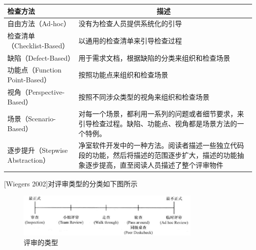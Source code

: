 \vspace{-0.8em}
\begin{center}
\begin{longtable}{|m{3cm}<{\centering}|m{8.5cm}|}
    \hline
    检查方法                       & \multicolumn{1}{c|}{描述}                                                                    \\ \hline
    自由方法（Ad-hoc）               & 没有为检查人员提供系统化的引导                                                       \\ \hline
    检查清单（Checklist-Based）      & 以通用的检查清单来引导检查过程                                                       \\ \hline
    缺陷（Defect-Based）           & 用于需求文档，根据缺陷的分类来组织和检查场景                                                \\ \hline
    功能点（Function Point-Based）  & 按照功能点来组织和检查场景                                                         \\ \hline
    视角（Perspective-Based）      & 按照不同涉众类型的视角来组织和检查场景                                                   \\ \hline
    场景（Scenario-Based）         & 对每一个场景，都利用一系列的问题或者细节要求，来引导检查过程。缺陷、功能点、视角都是场景方法的一个特例。                  \\ \hline
    逐步提升（Stepwise Abstraction） & 净室软件开发中的一种方法。阅读者描述一些独立代码段的功能，然后将描述的范围逐步扩大，描述的功能抽象逐步提高，直至阅读人员描述了整个评审物件 \\ \hline
\end{longtable}
\end{center}
\vspace{-3.7em}

[Wiegers 2002]对评审类型的分类如下图所示
\begin{figure}[H]
    \centering
    \vspace{-0.2em}
	\includegraphics[width=0.8\textwidth]{img/评审的类型.png}
    \caption*{评审的类型}
    \vspace{-1em}
\end{figure}


